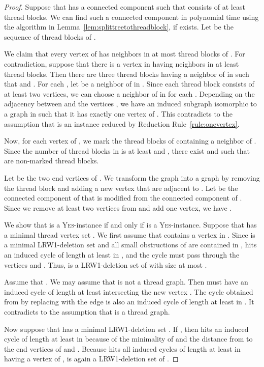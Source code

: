 \documentclass[11pt]{article}
\theoremstyle{remark}
\begin{document}
\begin{proof}
Suppose that  has a connected component  such that  consists of at least  thread blocks.
We can find such a connected component in polynomial time  using the algorithm in Lemma~\ref{lem:splittreetothreadblock}, if exists. 
Let  be the sequence of thread blocks of .

We claim that every vertex  of  has neighbors in at most  thread blocks of . 
For contradiction, suppose that there is a vertex  in  having neighbors in at least  thread blocks.
Then there are three thread blocks  having a neighbor of  in  such that  
 and .
For each , let  be a neighbor of  in .
Since each thread block consists of at least two vertices, 
we can choose a neighbor  of  in  for each .
Depending on the adjacency between  and the vertices , 
we have an induced subgraph  isomorphic to a graph in  such that it has exactly one vertex of .
This contradicts to the assumption that 
 is an instance reduced by Reduction Rule~\ref{rule:onevertex}.

Now, for each vertex  of , we mark the thread blocks  of  containing a neighbor of .
Since the number of thread blocks in  is at least  and
,
there exist  and  such that
 are non-marked thread blocks.






Let  be the two end vertices of .
We transform the graph  into a graph  by removing the thread block  and adding a new vertex  that are adjacent to . 
Let  be the connected component of  that is modified from the connected component  of .
Since we remove at least two vertices from  and add one vertex, we have .



We show that  is a \textsc{Yes}-instance if and only if  is a \textsc{Yes}-instance.
Suppose that  has a minimal thread vertex set .
We first assume that  contains a vertex  in .  
Since  is a minimal LRW1-deletion set and all small obstructions of  are contained in ,  hits an induced cycle of length at least  in , and 
the cycle must pass through the vertices  and .
Thus,  is a LRW1-deletion set of  with size at most .

Assume that . 
We may assume that  is not a thread graph. 
Then  must have an induced cycle  of length at least  intersecting the new vertex .
The cycle obtained from  by replacing  with the edge  is also an induced cycle of length at least  in . It contradicts to the assumption that 
 is a thread graph.

Now suppose that  has a minimal LRW1-deletion set .
If , then  hits an induced cycle of length at least  in  because of the minimality of  and the distance from  to the end vertices of  and .
Because  hits all induced cycles of length at least  in  having a vertex of ,  is again a LRW1-deletion set of . 


\end{proof}
\end{document}
